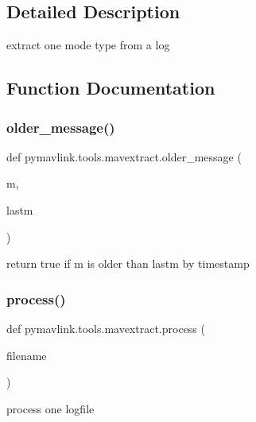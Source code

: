 \subsection{Detailed Description}
\begin{DoxyVerb}extract one mode type from a log
\end{DoxyVerb}
 

\subsection{Function Documentation}
\mbox{\label{namespacepymavlink_1_1tools_1_1mavextract_a0695c30418a7a66ccfdd36d36e194708}} 
\subsubsection{\texorpdfstring{older\+\_\+message()}{older\_message()}}
{\footnotesize\ttfamily def pymavlink.\+tools.\+mavextract.\+older\+\_\+message (\begin{DoxyParamCaption}\item[{}]{m,  }\item[{}]{lastm }\end{DoxyParamCaption})}

\begin{DoxyVerb}return true if m is older than lastm by timestamp\end{DoxyVerb}
 \mbox{\label{namespacepymavlink_1_1tools_1_1mavextract_aa4c714213c51b033aae1046e5ce2e1ab}} 
\subsubsection{\texorpdfstring{process()}{process()}}
{\footnotesize\ttfamily def pymavlink.\+tools.\+mavextract.\+process (\begin{DoxyParamCaption}\item[{}]{filename }\end{DoxyParamCaption})}

\begin{DoxyVerb}process one logfile\end{DoxyVerb}
 